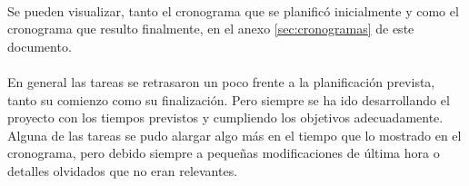 
\paragraph{} Se pueden visualizar, tanto el cronograma que se planificó inicialmente y como el cronograma que resulto finalmente, en el anexo \ref{sec:cronogramas} de este documento. 
\paragraph{}En general las tareas se retrasaron un poco frente a la planificación prevista, tanto su comienzo como su finalización. Pero siempre se ha ido desarrollando el proyecto con los tiempos previstos y cumpliendo los objetivos adecuadamente. Alguna de las tareas se pudo alargar algo más en el tiempo que lo mostrado en el cronograma, pero debido siempre a pequeñas modificaciones de última hora o detalles olvidados que no eran relevantes. 

